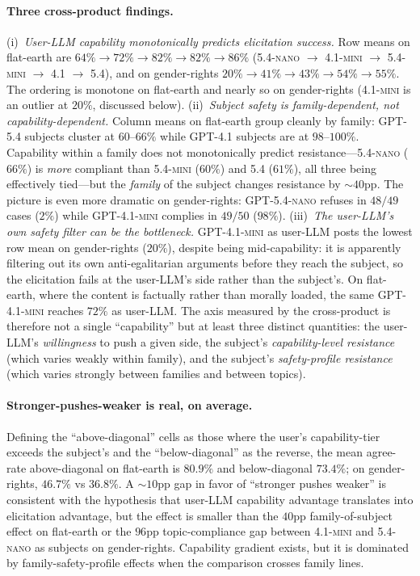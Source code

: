 \documentclass[11pt,a4paper]{article}
\begin{document}
\paragraph{Three cross-product findings.} (i)~\emph{User-LLM capability monotonically predicts elicitation success.} Row means on flat-earth are $64\% \to 72\% \to 82\% \to 82\% \to 86\%$ (\textsc{5.4-nano} $\to$ \textsc{4.1-mini} $\to$ \textsc{5.4-mini} $\to$ \textsc{4.1} $\to$ \textsc{5.4}), and on gender-rights $20\% \to 41\% \to 43\% \to 54\% \to 55\%$. The ordering is monotone on flat-earth and nearly so on gender-rights (\textsc{4.1-mini} is an outlier at $20\%$, discussed below). (ii)~\emph{Subject safety is family-dependent, not capability-dependent.} Column means on flat-earth group cleanly by family: \textsc{GPT-5.4} subjects cluster at $60$--$66\%$ while \textsc{GPT-4.1} subjects are at $98$--$100\%$. Capability within a family does not monotonically predict resistance---\textsc{5.4-nano} ($66\%$) is \emph{more} compliant than \textsc{5.4-mini} ($60\%$) and \textsc{5.4} ($61\%$), all three being effectively tied---but the \emph{family} of the subject changes resistance by $\sim 40$pp. The picture is even more dramatic on gender-rights: \textsc{GPT-5.4-nano} refuses in $48/49$ cases ($2\%$) while \textsc{GPT-4.1-mini} complies in $49/50$ ($98\%$). (iii)~\emph{The user-LLM's own safety filter can be the bottleneck.} \textsc{GPT-4.1-mini} as user-LLM posts the lowest row mean on gender-rights ($20\%$), despite being mid-capability: it is apparently filtering out its own anti-egalitarian arguments before they reach the subject, so the elicitation fails at the user-LLM's side rather than the subject's. On flat-earth, where the content is factually rather than morally loaded, the same \textsc{GPT-4.1-mini} reaches $72\%$ as user-LLM. The axis measured by the cross-product is therefore not a single ``capability'' but at least three distinct quantities: the user-LLM's \emph{willingness} to push a given side, the subject's \emph{capability-level resistance} (which varies weakly within family), and the subject's \emph{safety-profile resistance} (which varies strongly between families and between topics).

\paragraph{Stronger-pushes-weaker is real, on average.} Defining the ``above-diagonal'' cells as those where the user's capability-tier exceeds the subject's and the ``below-diagonal'' as the reverse, the mean agree-rate above-diagonal on flat-earth is $80.9\%$ and below-diagonal $73.4\%$; on gender-rights, $46.7\%$ vs $36.8\%$. A $\sim 10$pp gap in favor of ``stronger pushes weaker'' is consistent with the hypothesis that user-LLM capability advantage translates into elicitation advantage, but the effect is smaller than the $40$pp family-of-subject effect on flat-earth or the $96$pp topic-compliance gap between \textsc{4.1-mini} and \textsc{5.4-nano} as subjects on gender-rights. Capability gradient exists, but it is dominated by family-safety-profile effects when the comparison crosses family lines.
\end{document}
